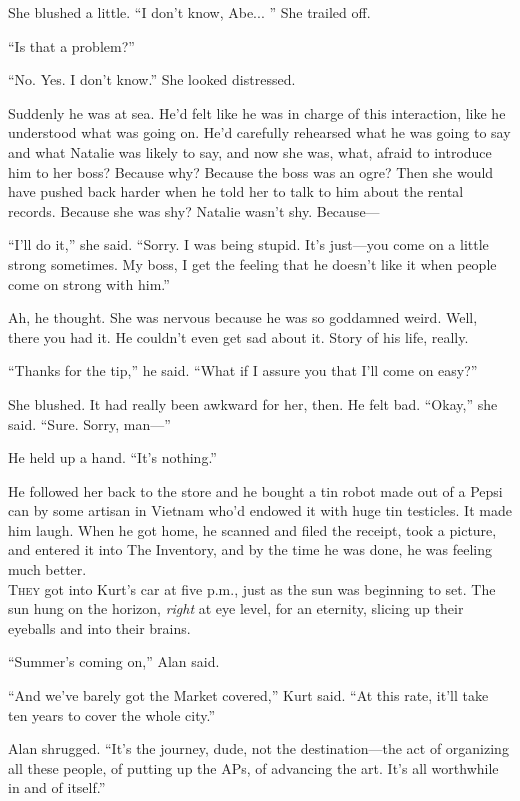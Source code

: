 \documentclass{article}
\begin{document}
She blushed a little.  ``I don't know, Abe...  '' She trailed off.

``Is that a problem?''

``No.  Yes.  I don't know.'' She looked distressed.

Suddenly he was at sea.  He'd felt like he was in charge of this
interaction, like he understood what was going on.  He'd carefully
rehearsed what he was going to say and what Natalie was likely to say,
and now she was, what, afraid to introduce him to her boss?  Because
why?  Because the boss was an ogre?  Then she would have pushed back
harder when he told her to talk to him about the rental records. 
Because she was shy?  Natalie wasn't shy.  Because---

``I'll do it,'' she said.  ``Sorry.  I was being stupid.  It's
just---you come on a little strong sometimes.  My boss, I get the
feeling that he doesn't like it when people come on strong with him.''

Ah, he thought.  She was nervous because he was so goddamned weird. 
Well, there you had it.  He couldn't even get sad about it.  Story of
his life, really.

``Thanks for the tip,'' he said.  ``What if I assure you that I'll
come on easy?''

She blushed.  It had really been awkward for her, then.  He felt bad. 
``Okay,'' she said.  ``Sure.  Sorry, man---''

He held up a hand.  ``It's nothing.''

He followed her back to the store and he bought a tin robot made out
of a Pepsi can by some artisan in Vietnam who'd endowed it with huge
tin testicles.  It made him laugh.  When he got home, he scanned and
filed the receipt, took a picture, and entered it into The Inventory,
and by the time he was done, he was feeling much better.
\\
\lettrine[lines=3, lhang=.5, nindent=0pt, findent=2pt]{T}{hey} got into Kurt's car at five p.m., just as the sun was beginning
to set.  The sun hung on the horizon, \textit{right} at eye level, for
an eternity, slicing up their eyeballs and into their brains.

``Summer's coming on,'' Alan said.

``And we've barely got the Market covered,'' Kurt said.  ``At this
rate, it'll take ten years to cover the whole city.''

Alan shrugged.  ``It's the journey, dude, not the destination---the
act of organizing all these people, of putting up the APs, of
advancing the art.  It's all worthwhile in and of itself.''
\end{document}
